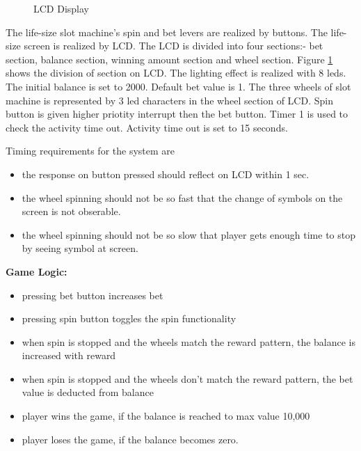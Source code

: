 \documentclass[a4paper,13pt,sffamily,margin=20mm]{memoir}
\begin{document}
\begin{figure}[h]
\caption{LCD Display }
\label{Fig_LCD_Split}
\end{figure}
The life-size slot machine's spin and bet levers are realized by buttons. The life-size screen is realized by LCD. The LCD is divided into four sections:- bet section, balance section, winning amount section and wheel section. Figure \ref{Fig_LCD_Split} shows the division of section on LCD. The lighting effect is realized with 8 leds. The initial balance is set to 2000. Default bet value is 1. The three wheels of slot machine is represented by 3 led characters in the wheel section of LCD. Spin button is given higher priotity interrupt then the bet button. Timer 1 is used to check the activity time out. Activity time out is set to 15 seconds.  


\break
Timing requirements for the system are
\begin{itemize}
\item the response on button pressed should reflect on LCD within 1 sec.
\item the wheel spinning should not be so fast that the change of symbols on the screen is not obserable.
\item the wheel spinning should not be so slow that player gets enough time to stop by seeing symbol at screen.
\end{itemize}


\large \textbf{ Game Logic:}

\begin{itemize}
\item pressing bet button increases bet
\item pressing spin button toggles the spin functionality 
\item when spin is stopped and the wheels match the reward pattern, the balance is increased with reward
\item when spin is stopped and the wheels don't match the reward pattern, the bet value is deducted from balance
\item player wins the game, if the balance is reached to max value 10,000
\item player loses the game, if the balance becomes zero.
\end{itemize}
\end{document}
